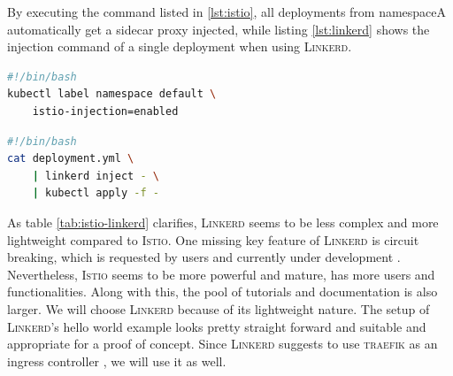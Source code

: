 By executing the command listed in \ref{lst:istio}, all deployments from namespaceA automatically get a sidecar proxy injected, while listing \ref{lst:linkerd} shows the injection command of a single deployment when using \textsc{Linkerd}.

\begin{lstlisting}[language=bash,caption={Injection of sidecards into deployments of a namespace in \textsc{Istio}},label={lst:istio}]
#!/bin/bash
kubectl label namespace default \
	istio-injection=enabled
\end{lstlisting}

\begin{lstlisting}[language=bash,caption={Injection of sidecards into a deployment in \textsc{Linkerd}}, label={lst:linkerd}]
#!/bin/bash
cat deployment.yml \
	| linkerd inject - \
	| kubectl apply -f -
\end{lstlisting}

%
% 

As table \ref{tab:istio-linkerd} clarifies, \textsc{Linkerd} seems to be less complex and more lightweight compared to \textsc{Istio}. One missing key feature of \textsc{Linkerd} is circuit breaking, which is requested by users and currently under development \cite{linkerd-circuit-breaker}. Nevertheless, \textsc{Istio} seems to be more powerful and mature, has more users and functionalities. Along with this, the pool of tutorials and documentation is also larger.
We will choose \textsc{Linkerd} because of its lightweight nature. The setup of \textsc{Linkerd}'s hello world example looks pretty straight forward and suitable and appropriate for a proof of concept. Since \textsc{Linkerd} suggests to use \textsc{traefik} as an ingress controller \cite{linkerd-traefik}, we will use it as well.